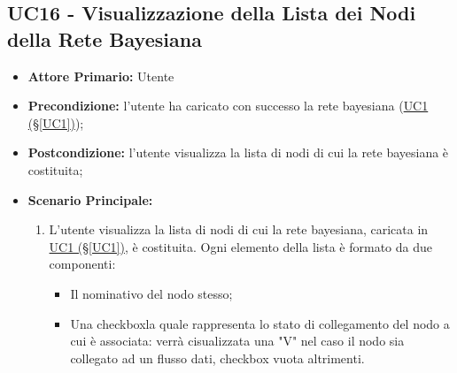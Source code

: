 \pagebreak

\subsection{UC16 - Visualizzazione della Lista dei Nodi della Rete Bayesiana}\label{UC16}
\begin{itemize}
	\item \textbf{Attore Primario:}  Utente
	\item \textbf{Precondizione:} l'utente ha caricato con successo la rete bayesiana (\hyperref[UC1]{UC1 	(§\ref*{UC1})});
	\item \textbf{Postcondizione:} l'utente visualizza la lista di nodi di cui la rete bayesiana è costituita;
	\item \textbf{Scenario Principale:}
	\begin{enumerate}
		\item L'utente visualizza la lista di nodi di cui la rete bayesiana, caricata in \hyperref[UC1]{UC1 									(§\ref*{UC1})}, è costituita. Ogni elemento della lista è formato da due componenti:
		\begin{itemize}
			\item Il nominativo del nodo stesso;
			\item Una checkbox\glossario la quale rappresenta lo stato di collegamento del nodo a cui è associata: verrà cisualizzata una "V" nel caso il nodo sia collegato ad un flusso dati, checkbox vuota altrimenti.
		\end{itemize}
	\end{enumerate}
\end{itemize}

\pagebreak

